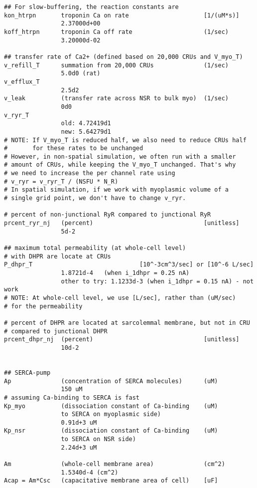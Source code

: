 \begin{verbatim}
## For slow-buffering, the reaction constants are
kon_htrpn       troponin Ca on rate                     [1/(uM*s)]
                2.37000d+00
koff_htrpn      troponin Ca off rate                    (1/sec)
                3.20000d-02

## transfer rate of Ca2+ (defined based on 20,000 CRUs and V_myo_T)
v_refill_T      summation from 20,000 CRUs              (1/sec)
                5.0d0 (rat)
v_efflux_T
                2.5d2 
v_leak          (transfer rate across NSR to bulk myo)  (1/sec)
                0d0
v_ryr_T
                old: 4.72419d1
                new: 5.64279d1 
# NOTE: If V_myo_T is reduced half, we also need to reduce CRUs half
#       for these rates to be unchanged
# However, in non-spatial simulation, we often run with a smaller
# amount of CRUs, while keeping the V_myo_T unchanged. That's why 
# we need to increase the per channel rate using
# v_ryr = v_ryr_T / (NSFU * N_R)
# In spatial simulation, if we work with myoplasmic volume of a 
# single grid point, we don't have to change v_ryr.

# percent of non-junctional RyR compared to junctional RyR
prcent_ryr_nj   (percent)                               [unitless]
                5d-2

## maximum total permeability (at whole-cell level)
# with DHPR are locate at CRUs 
P_dhpr_T                              [10^-3cm^3/sec] or [10^-6 L/sec]
                1.8721d-4   (when i_1dhpr = 0.25 nA)
                other to try: 1.1233d-3 (when i_1dhpr = 0.15 nA) - not work
# NOTE: At whole-cell level, we use [L/sec], rather than (uM/sec)
# for the permeability

# percent of DHPR are located at sarcolemmal membrane, but not in CRU
# compared to junctional DHPR
prcent_dhpr_nj  (percent)                               [unitless]
                10d-2


## SERCA-pump
Ap              (concentration of SERCA molecules)      (uM)
                150 uM
# assuming Ca-binding to SERCA is fast                
Kp_myo          (dissociation constant of Ca-binding    (uM)
                to SERCA on myoplasmic side)
                0.91d+3 uM             
Kp_nsr          (dissociation constant of Ca-binding    (uM)
                to SERCA on NSR side)
                2.24d+3 uM

Am              (whole-cell membrane area)              (cm^2)
                1.5340d-4 (cm^2)
Acap = Am*Csc   (capacitative membrane area of cell)    [uF]



\end{verbatim}
